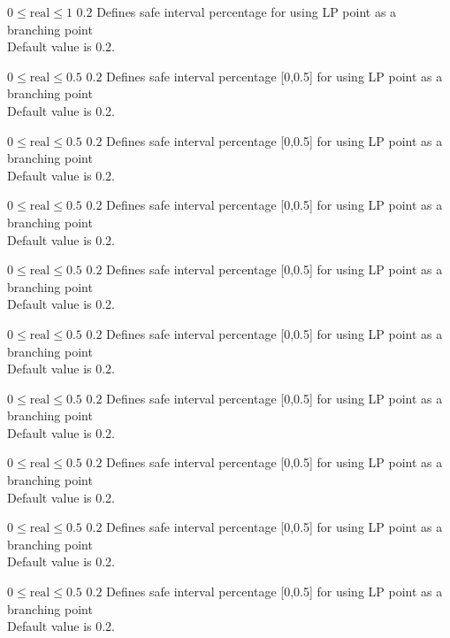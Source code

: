 %
{$0\leq\textrm{real}\leq1$}%
{$0.2$}%
{Defines safe interval percentage for using LP point as a branching point\\
Default value is 0.2.}%
{}

%
{$0\leq\textrm{real}\leq0.5$}%
{$0.2$}%
{Defines safe interval percentage [0,0.5] for using LP point as a branching point\\
Default value is 0.2.}%
{}

%
{$0\leq\textrm{real}\leq0.5$}%
{$0.2$}%
{Defines safe interval percentage [0,0.5] for using LP point as a branching point\\
Default value is 0.2.}%
{}

%
{$0\leq\textrm{real}\leq0.5$}%
{$0.2$}%
{Defines safe interval percentage [0,0.5] for using LP point as a branching point\\
Default value is 0.2.}%
{}

%
{$0\leq\textrm{real}\leq0.5$}%
{$0.2$}%
{Defines safe interval percentage [0,0.5] for using LP point as a branching point\\
Default value is 0.2.}%
{}

%
{$0\leq\textrm{real}\leq0.5$}%
{$0.2$}%
{Defines safe interval percentage [0,0.5] for using LP point as a branching point\\
Default value is 0.2.}%
{}

%
{$0\leq\textrm{real}\leq0.5$}%
{$0.2$}%
{Defines safe interval percentage [0,0.5] for using LP point as a branching point\\
Default value is 0.2.}%
{}

%
{$0\leq\textrm{real}\leq0.5$}%
{$0.2$}%
{Defines safe interval percentage [0,0.5] for using LP point as a branching point\\
Default value is 0.2.}%
{}

%
{$0\leq\textrm{real}\leq0.5$}%
{$0.2$}%
{Defines safe interval percentage [0,0.5] for using LP point as a branching point\\
Default value is 0.2.}%
{}

%
{$0\leq\textrm{real}\leq0.5$}%
{$0.2$}%
{Defines safe interval percentage [0,0.5] for using LP point as a branching point\\
Default value is 0.2.}%
{}

